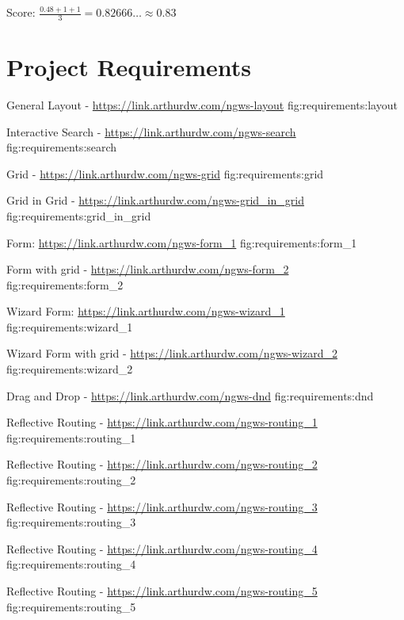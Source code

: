 Score: $\frac{0.48 + 1 + 1}{3} = 0.82666\dots \approx 0.83$


\chapter{Project Requirements}

{General Layout - \url{https://link.arthurdw.com/ngws-layout}}
{fig:requirements:layout}

{Interactive Search - \url{https://link.arthurdw.com/ngws-search}}
{fig:requirements:search}

{Grid - \url{https://link.arthurdw.com/ngws-grid}}
{fig:requirements:grid}

{Grid in Grid - \url{https://link.arthurdw.com/ngws-grid_in_grid}}
{fig:requirements:grid_in_grid}

{Form: \url{https://link.arthurdw.com/ngws-form_1}}
{fig:requirements:form_1}

{Form with grid - \url{https://link.arthurdw.com/ngws-form_2}}
{fig:requirements:form_2}

{Wizard Form: \url{https://link.arthurdw.com/ngws-wizard_1}}
{fig:requirements:wizard_1}

{Wizard Form with grid - \url{https://link.arthurdw.com/ngws-wizard_2}}
{fig:requirements:wizard_2}

{Drag and Drop - \url{https://link.arthurdw.com/ngws-dnd}}
{fig:requirements:dnd}

{Reflective Routing - \url{https://link.arthurdw.com/ngws-routing_1}}
{fig:requirements:routing_1}

{Reflective Routing - \url{https://link.arthurdw.com/ngws-routing_2}}
{fig:requirements:routing_2}

{Reflective Routing - \url{https://link.arthurdw.com/ngws-routing_3}}
{fig:requirements:routing_3}

{Reflective Routing - \url{https://link.arthurdw.com/ngws-routing_4}}
{fig:requirements:routing_4}

{Reflective Routing - \url{https://link.arthurdw.com/ngws-routing_5}}
{fig:requirements:routing_5}

